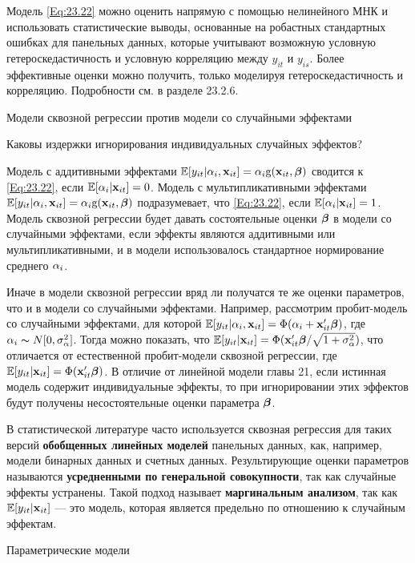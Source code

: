 Модель \ref{Eq:23.22} можно оценить напрямую с помощью нелинейного МНК и использовать статистические выводы, основанные на робастных стандартных ошибках для панельных данных, которые учитывают возможную условную гетероскедастичность и условную корреляцию между $y_{it}$ и  $y_{is}$. Более эффективные оценки можно получить, только моделируя гетероскедастичность и корреляцию. Подробности см. в разделе 23.2.6.

{\centering Модели сквозной регрессии против модели со случайными эффектами \\}

Каковы издержки игнорирования индивидуальных случайных эффектов?

Модель с аддитивными эффектами $\mathbb{E}[y_{it}|\alpha_i, \mathbf{x}_{it}]=\alpha_i \mathrm g(\mathbf{x}_{it}, \bm{\beta})$ сводится к \ref{Eq:23.22}, если $\mathbb{E}[\alpha_i|\mathbf{x}_{it}]=0$. Модель с мультипликативными эффектами $\mathbb{E}[y_{it}|\alpha_i, \mathbf{x}_{it}]=\alpha_i \mathrm g(\mathbf{x}_{it}, \bm{\beta})$ подразумевает, что   \ref{Eq:23.22}, если $\mathbb{E}[\alpha_i|\mathbf{x}_{it}]=1$. Модель сквозной регрессии будет давать состоятельные оценки $\bm{\beta}$ в модели со случайными эффектами, если эффекты являются аддитивными или мультипликативными, и в модели использовалось стандартное нормирование  среднего $\alpha_i$.

Иначе в модели сквозной регрессии вряд ли получатся те же оценки параметров, что и в модели со случайными эффектами. Например, рассмотрим пробит-модель со случайными эффектами, для которой $\mathbb{E}[y_{it}|\alpha_i, \mathbf{x}_{it}]=\Phi(\alpha_i+\mathbf{x}_{it}'\bm{\beta})$, где $\alpha_i \thicksim N[0,\sigma^2_{\alpha}]$. Тогда можно показать, что $\mathbb{E}[y_{it}|\mathbf{x}_{it}]=\Phi(\mathbf{x}_{it}'\bm{\beta}/\sqrt{1+\sigma^2_{\alpha}})$, что отличается от естественной пробит-модели сквозной регрессии, где $\mathbb{E}[y_{it}|\mathbf{x}_{it}]=\Phi(\mathbf{x}_{it}'\bm{\beta})$. В отличие от линейной модели главы 21, если истинная модель содержит индивидуальные эффекты, то при игнорировании этих эффектов будут получены несостоятельные оценки параметра $\bm{\beta}$.

В статистической литературе часто используется сквозная регрессия для таких версий \textbf{обобщенных линейных моделей} панельных данных, как, например, модели бинарных данных и счетных данных. Результирующие оценки параметров называются \textbf{усредненными по генеральной совокупности}, так как случайные эффекты устранены. Такой подход называет \textbf{маргинальным анализом}, так как $\mathbb{E}[y_{it}|\mathbf{x}_{it}]$ --- это модель, которая является предельно по отношению к случайным эффектам.

{\centering Параметрические модели \\}

